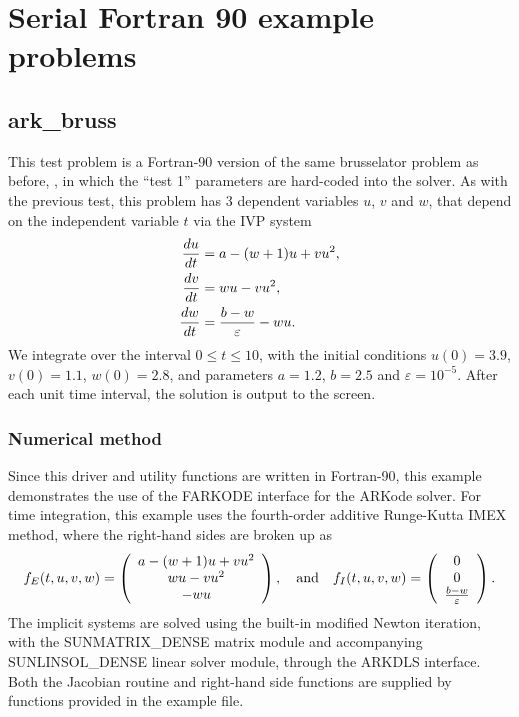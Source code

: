 \documentclass[letterpaper,10pt,english]{sphinxmanual}
\begin{document}
\chapter{Serial Fortran 90 example problems}
\label{f90_serial:serial-f90}\label{f90_serial:serial-fortran-90-example-problems}\label{f90_serial::doc}

\section{ark\_bruss}
\label{f90_serial:ark-bruss}\label{f90_serial:id1}
This test problem is a Fortran-90 version of the same brusselator
problem as before, {\hyperref[c_serial:ark-brusselator]{\emph{}}}, in which the ``test 1''
parameters are hard-coded into the solver.  As with the previous test,
this problem has 3 dependent variables \(u\), \(v\) and
\(w\), that depend on the independent variable \(t\) via the
IVP system
\begin{gather}
\begin{split}\frac{du}{dt} &= a - (w+1)u + v u^2, \\
\frac{dv}{dt} &= w u - v u^2, \\
\frac{dw}{dt} &= \frac{b-w}{\varepsilon} - w u.\end{split}\notag
\end{gather}
We integrate over the interval \(0 \le t \le 10\), with the
initial conditions \(u(0) = 3.9\), \(v(0) = 1.1\),
\(w(0) = 2.8\), and parameters \(a=1.2\), \(b=2.5\) and
\(\varepsilon=10^{-5}\).  After each unit time interval, the
solution is output to the screen.


\subsection{Numerical method}
\label{f90_serial:numerical-method}
Since this driver and utility functions are written in Fortran-90,
this example demonstrates the use of the FARKODE interface for the
ARKode solver.  For time integration, this example uses the
fourth-order additive Runge-Kutta IMEX method, where the right-hand
sides are broken up as
\begin{gather}
\begin{split}f_E(t,u,v,w) = \left(\begin{array}{c} a - (w+1)u + v u^2 \\
  w u - v u^2 \\ - w u  \end{array}\right), \quad\text{and}\quad
f_I(t,u,v,w) = \left(\begin{array}{c} 0\\0\\
  \frac{b-w}{\varepsilon}\end{array}\right).\end{split}\notag
\end{gather}
The implicit systems are solved using the built-in modified Newton
iteration, with the SUNMATRIX\_DENSE matrix module and accompanying
SUNLINSOL\_DENSE linear solver module, through the ARKDLS interface.
Both the Jacobian routine and right-hand side functions are supplied
by functions provided in the example file.
\end{document}
